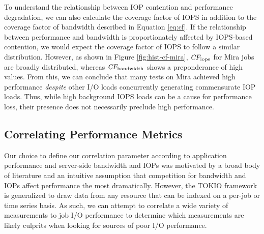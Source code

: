 To understand the relationship between IOP contention and performance degradation, we can also calculate the coverage factor of IOPS in addition to the coverage factor of bandwidth described in Equation \ref{eq:cf}.
If the relationship between performance and bandwidth is proportionately affected by IOPS-based contention, we would expect the coverage factor of IOPS to follow a similar distribution.
However, as shown in Figure \ref{fig:hist-cf-mira}, $\textit{CF}_{\textup{iops}}$ for Mira jobs are broadly distributed, whereas $\textit{CF}_{\textup{bandwidth}}$ shows a preponderance of high values.
From this, we can conclude that many tests on Mira achieved high performance \emph{despite} other I/O loads concurrently generating commensurate IOP loads.
Thus, while high background IOPS loads can be a cause for performance loss, their presence does not necessarily preclude high performance.



\subsection{Correlating Performance Metrics} \label{sec:results/correlating}


Our choice to define our correlation parameter according to application performance and server-side bandwidth and IOPs was motivated by a broad body of literature and an intuitive assumption that competition for bandwidth and IOPs affect performance the most dramatically.
However, the TOKIO framework is generalized to draw data from any resource that can be indexed on a per-job or time series basis.
As such, we can attempt to correlate a wide variety of measurements to job I/O performance to determine which measurements are likely culprits when looking for sources of poor I/O performance.

